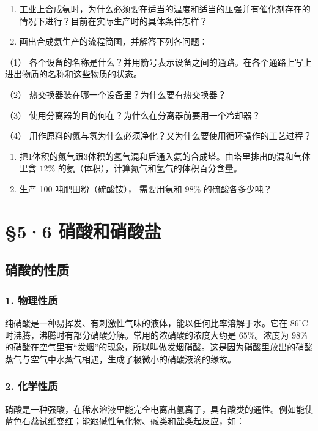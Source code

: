 \begin{enumerate}
\item
  工业上合成氨时，为什么必须要在适当的温度和适当的压强并有催化剂存在的情况下进行？目前在实际生产时的具体条件怎样？
\item
  画出合成氨生产的流程简图，并解答下列各问题：
\end{enumerate}

（1）
各个设备的名称是什么？并用箭号表示设备之间的通路。在各个通路上写上进出物质的名称和这些物质的状态。

（2） 热交换器装在哪一个设备里？为什么要有热交换器？

（3） 使用分离器的目的何在？为什么在分离器前要用一个冷却器？

（4） 用作原料的氮与氢为什么必须净化？又为什么要使用循环操作的工艺过程？

\begin{enumerate}[start=3]
\item
  把1体积的氮气跟3体积的氢气混和后通入氨的合成塔。由塔里排出的混和气体里含
  \(12\%\) 的氨（体积），计算氮气和氢气的体积百分含量。
\item
  生产 100 吨肥田粉（硫酸铵）， 需要用氨和 98\% 的硫酸各多少吨？
\end{enumerate}

\section{§5·6 硝酸和硝酸盐}

\subsection{硝酸的性质}

\subsubsection{1. 物理性质}

纯硝酸是一种易挥发、有刺激性气味的液体，能以任何比率溶解于水。它在
\(86^{\circ} \mathrm{C}\)
时沸腾，沸腾时有部分硝酸分解。常用的浓硝酸的浓度大约是 \(65 \%\)。浓度为
\(98 \%\)
的硝酸在空气里有``发烟''的现象，所以叫做发烟硝酸。这是因为硝酸里放出的硝酸蒸气与空气中水蒸气相遇，生成了极微小的硝酸液滴的缘故。

\subsubsection{2. 化学性质}

硝酸是一种强酸，在稀水溶液里能完全电离出氢离子，具有酸类的通性。例如能使蓝色石蕊试纸变红；能跟碱性氧化物、碱类和盐类起反应，如：

